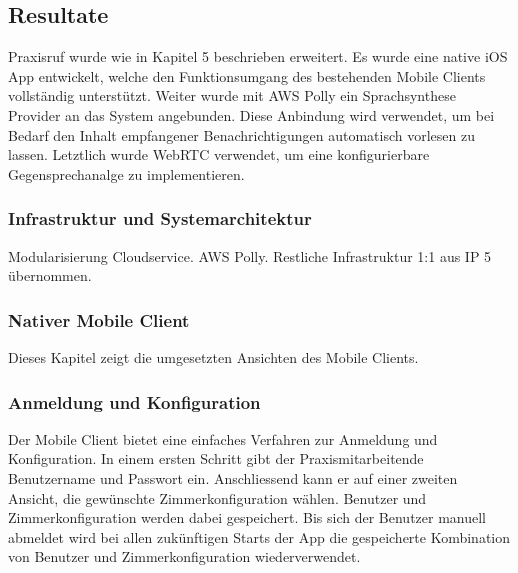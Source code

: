 \subsection{Resultate}

Praxisruf wurde wie in Kapitel 5 beschrieben erweitert.
Es wurde eine native iOS App entwickelt, welche den Funktionsumgang des bestehenden Mobile Clients vollständig unterstützt.
Weiter wurde mit AWS Polly ein Sprachsynthese Provider an das System angebunden.
Diese Anbindung wird verwendet, um bei Bedarf den Inhalt empfangener Benachrichtigungen automatisch vorlesen zu lassen.
Letztlich wurde WebRTC verwendet, um eine konfigurierbare Gegensprechanalge zu implementieren.

\subsubsection{Infrastruktur und Systemarchitektur}

Modularisierung Cloudservice.
AWS Polly.
Restliche Infrastruktur 1:1 aus IP 5 übernommen.

\clearpage

\subsubsection{Nativer Mobile Client}

Dieses Kapitel zeigt die umgesetzten Ansichten des Mobile Clients.

\subsubsection*{Anmeldung und Konfiguration}

Der Mobile Client bietet eine einfaches Verfahren zur Anmeldung und Konfiguration.
In einem ersten Schritt gibt der Praxismitarbeitende Benutzername und Passwort ein.
Anschliessend kann er auf einer zweiten Ansicht, die gewünschte Zimmerkonfiguration wählen.
Benutzer und Zimmerkonfiguration werden dabei gespeichert.
Bis sich der Benutzer manuell abmeldet wird bei allen zukünftigen Starts der App die gespeicherte Kombination von Benutzer und Zimmerkonfiguration wiederverwendet.

